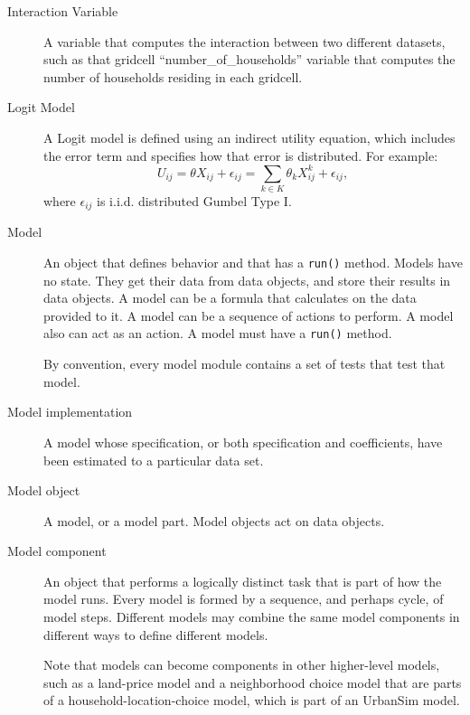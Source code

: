 \begin{description}
\item[Interaction Variable] 
A variable that computes the interaction between two different
datasets, such as that gridcell ``number_of_households'' 
variable that computes the number of households residing in
each gridcell.

\item[Logit Model]  
A Logit model is defined using an indirect utility equation, which
includes the error term and specifies how that error is
distributed. For example:
\begin{equation}
    U_{ij}={\theta}{X}_{ij}+\epsilon_{ij}
    =\sum_{k \in K}{\theta}_{k}X^{k}_{ij}+\epsilon_{ij},
\end{equation}
\indent where $\epsilon_{ij}$ is i.i.d. distributed Gumbel Type I.

\item[Model] 
An object that defines behavior and that has a \verb|run()|
method.  Models have no state. They get their data from data
objects, and store their results in data objects.  A model can be
a formula that calculates on the data provided to it. A model can
be a sequence of actions to perform.  A model also can act as an
action.  A model must have a \verb|run()| method.

By convention, every model
module contains a set of tests that test that model.

\item[Model implementation] 
A model whose specification, or both specification and
coefficients, have been estimated to a particular data set.

\item[Model object] 
A model, or a model part.  Model objects act on data objects.

\item[Model component] 
An object that performs a logically distinct task that is part of
how the model runs.  Every model is formed by a sequence, and
perhaps cycle, of model steps.  Different models may 
combine the same model components in different ways to define
different models.

Note that models can become components in other higher-level models, such as a
land-price model and a neighborhood choice model that are parts of a
household-location-choice model, which is part of an UrbanSim model.


\end{description}
